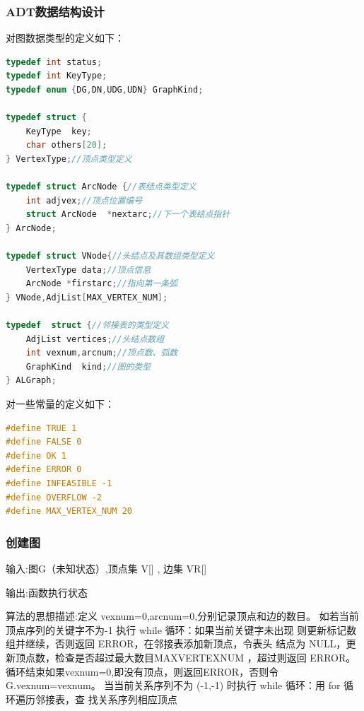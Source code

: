 \documentclass[supercite]{Experimental_Report}
\theoremstyle{definition}
\begin{document}
\subsubsection{ADT数据结构设计}
\noindent 对图数据类型的定义如下：\par
\begin{lstlisting}[language=C] 
typedef int status;
typedef int KeyType; 
typedef enum {DG,DN,UDG,UDN} GraphKind;

typedef struct {
    KeyType  key;
    char others[20];
} VertexType;//顶点类型定义

typedef struct ArcNode {//表结点类型定义
   	int adjvex;//顶点位置编号 
    struct ArcNode  *nextarc;//下一个表结点指针
} ArcNode;

typedef struct VNode{//头结点及其数组类型定义
   	VertexType data;//顶点信息
    ArcNode *firstarc;//指向第一条弧
} VNode,AdjList[MAX_VERTEX_NUM];

typedef  struct {//邻接表的类型定义
    AdjList vertices;//头结点数组
    int vexnum,arcnum;//顶点数、弧数
    GraphKind  kind;//图的类型
} ALGraph;	
\end{lstlisting}
对一些常量的定义如下：
\begin{lstlisting}[language=C] 
#define TRUE 1
#define FALSE 0
#define OK 1
#define ERROR 0
#define INFEASIBLE -1
#define OVERFLOW -2
#define MAX_VERTEX_NUM 20
\end{lstlisting}

\subsubsection{创建图}
输入:图G（未知状态）,顶点集 V[] , 边集 VR[]

输出:函数执行状态

算法的思想描述:定义 vexnum=0,arcnum=0,分别记录顶点和边的数目。
如若当前顶点序列的关键字不为-1 执行 while 循环：如果当前关键字未出现
则更新标记数组并继续，否则返回 ERROR，在邻接表添加新顶点，令表头
结点为 NULL，更新顶点数，检查是否超过最大数目MAXVERTEXNUM ，超过则返回 ERROR。
循环结束如果vexnum=0,即没有顶点，则返回ERROR，否则令G.vexnum=vexnum。
当当前关系序列不为 (-1,-1) 时执行 while 循环：用 for 循环遍历邻接表，查
找关系序列相应顶点
\end{document}
